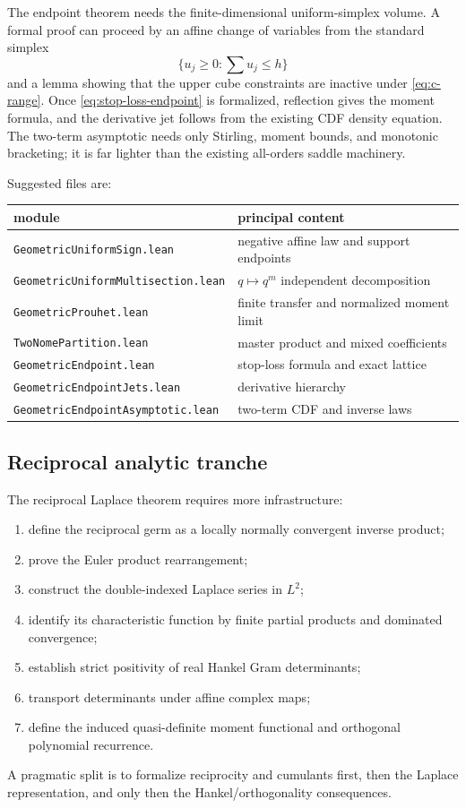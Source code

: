 \documentclass[11pt,oneside]{article}
\numberwithin{equation}{section}
\theoremstyle{definition}
\theoremstyle{remark}
\begin{document}
The endpoint theorem needs the finite-dimensional uniform-simplex volume.  A
formal proof can proceed by an affine change of variables from the standard
simplex
\[
 \{u_j\ge0:\sum u_j\le h\}
\]
and a lemma showing that the upper cube constraints are inactive under
\eqref{eq:c-range}.  Once \eqref{eq:stop-loss-endpoint} is formalized,
reflection gives the moment formula, and the derivative jet follows from the
existing CDF density equation.  The two-term asymptotic needs only Stirling,
moment bounds, and monotonic bracketing; it is far lighter than the existing
all-orders saddle machinery.

Suggested files are:
\begin{center}
\begin{tabular}{l l}
\toprule
module & principal content \\
\midrule
\texttt{GeometricUniformSign.lean} & negative affine law and support endpoints \\
\texttt{GeometricUniformMultisection.lean} & $q\mapsto q^m$ independent decomposition \\
\texttt{GeometricProuhet.lean} & finite transfer and normalized moment limit \\
\texttt{TwoNomePartition.lean} & master product and mixed coefficients \\
\texttt{GeometricEndpoint.lean} & stop-loss formula and exact lattice \\
\texttt{GeometricEndpointJets.lean} & derivative hierarchy \\
\texttt{GeometricEndpointAsymptotic.lean} & two-term CDF and inverse laws \\
\bottomrule
\end{tabular}
\end{center}

\subsection{Reciprocal analytic tranche}

The reciprocal Laplace theorem requires more infrastructure:
\begin{enumerate}
\item define the reciprocal germ as a locally normally convergent inverse
      product;
\item prove the Euler product rearrangement;
\item construct the double-indexed Laplace series in $L^2$;
\item identify its characteristic function by finite partial products and
      dominated convergence;
\item establish strict positivity of real Hankel Gram determinants;
\item transport determinants under affine complex maps;
\item define the induced quasi-definite moment functional and orthogonal
      polynomial recurrence.
\end{enumerate}
A pragmatic split is to formalize reciprocity and cumulants first, then the
Laplace representation, and only then the Hankel/orthogonality consequences.
\end{document}
